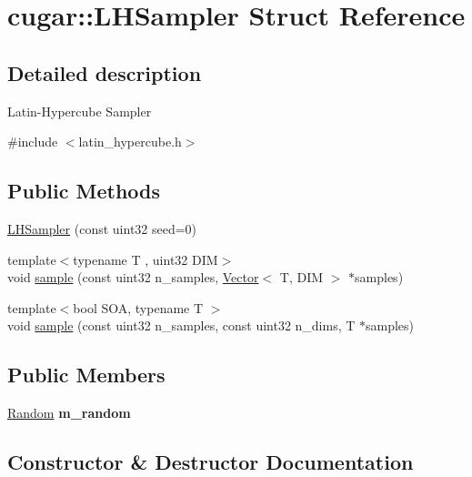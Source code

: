 \hypertarget{structcugar_1_1_l_h_sampler}{}\section{cugar\+:\+:L\+H\+Sampler Struct Reference}
\label{structcugar_1_1_l_h_sampler}


\subsection{Detailed description}
Latin-\/\+Hypercube Sampler 

{\ttfamily \#include $<$latin\+\_\+hypercube.\+h$>$}

\subsection*{Public Methods}
\begin{DoxyCompactItemize}
\item 
\hyperlink{structcugar_1_1_l_h_sampler_a8453aa1db9cae158d609cbb9e5843f5b}{L\+H\+Sampler} (const uint32 seed=0)
\item 
{\footnotesize template$<$typename T , uint32 D\+IM$>$ }\\void \hyperlink{structcugar_1_1_l_h_sampler_a834984a5429b711dc3be799b927905d1}{sample} (const uint32 n\+\_\+samples, \hyperlink{structcugar_1_1_vector}{Vector}$<$ T, D\+IM $>$ $\ast$samples)
\item 
{\footnotesize template$<$bool S\+OA, typename T $>$ }\\void \hyperlink{structcugar_1_1_l_h_sampler_ab3422ecf79d29b9327cda1633f01caae}{sample} (const uint32 n\+\_\+samples, const uint32 n\+\_\+dims, T $\ast$samples)
\end{DoxyCompactItemize}
\subsection*{Public Members}
\begin{DoxyCompactItemize}
\item 
\mbox{\label{structcugar_1_1_l_h_sampler_a34b6dfc455feb895c9f227032f88e398}} 
\hyperlink{structcugar_1_1_random}{Random} {\bfseries m\+\_\+random}
\end{DoxyCompactItemize}


\subsection{Constructor \& Destructor Documentation}
\mbox{\label{structcugar_1_1_l_h_sampler_a8453aa1db9cae158d609cbb9e5843f5b}} 
